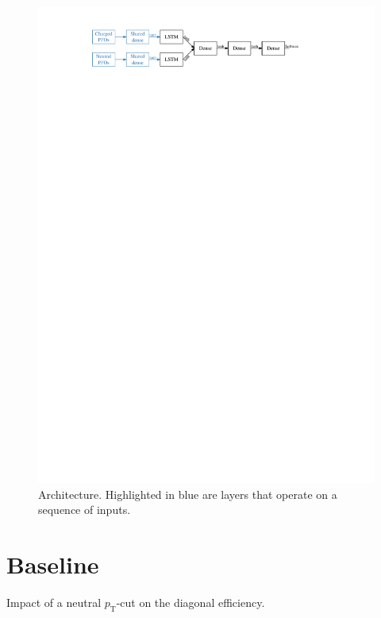 \begin{figure}[ht]
  \centering
  \includegraphics{./figures/decay_mode_classification/baseline_architecture.pdf}
  \caption{Architecture. Highlighted in blue are layers that operate on a sequence of inputs.}
  \label{fig:pfo_rnn_baseline_arch}
\end{figure}


\section{Baseline}
\label{sec:pfo_baseline}

\begin{table}[ht]
  \centering
  
  \caption{Impact of a neutral $p_\text{T}$-cut on the diagonal
    efficiency.}
  \label{tab:neut_ptcut}
\end{table}


